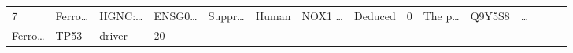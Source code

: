 \documentclass[
]{article}
\begin{document}
\begin{longtable}[]{@{}lllllllllllllll@{}}
\begin{minipage}[t]{0.02\columnwidth}
7\strut
\end{minipage} & \begin{minipage}[t]{0.05\columnwidth}\raggedright
Ferro\ldots{}\strut
\end{minipage} & \begin{minipage}[t]{0.05\columnwidth}\raggedright
HGNC:\ldots{}\strut
\end{minipage} & \begin{minipage}[t]{0.05\columnwidth}\raggedright
ENSG0\ldots{}\strut
\end{minipage} & \begin{minipage}[t]{0.05\columnwidth}\raggedright
Suppr\ldots{}\strut
\end{minipage} & \begin{minipage}[t]{0.05\columnwidth}\raggedright
Human\strut
\end{minipage} & \begin{minipage}[t]{0.05\columnwidth}\raggedright
NOX1 \ldots{}\strut
\end{minipage} & \begin{minipage}[t]{0.05\columnwidth}\raggedright
Deduced\strut
\end{minipage} & \begin{minipage}[t]{0.05\columnwidth}\raggedright
0\strut
\end{minipage} & \begin{minipage}[t]{0.05\columnwidth}\raggedright
The p\ldots{}\strut
\end{minipage} & \begin{minipage}[t]{0.05\columnwidth}\raggedright
Q9Y5S8\strut
\end{minipage} & \begin{minipage}[t]{0.02\columnwidth}\raggedright
\ldots{}\strut
\end{minipage}\tabularnewline
\begin{minipage}[t]{0.05\columnwidth}\raggedright
Ferro\ldots{}\strut
\end{minipage} & \begin{minipage}[t]{0.05\columnwidth}\raggedright
TP53\strut
\end{minipage} & \begin{minipage}[t]{0.04\columnwidth}\raggedright
driver\strut
\end{minipage} & \begin{minipage}[t]{0.02\columnwidth}\raggedright
20\strut
\end{minipage} & \begin{minipage}[t]{0.05\columnwidth}\raggedright

\end{minipage}
\end{longtable}
\end{document}
